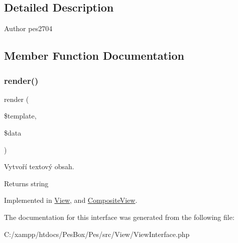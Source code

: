 \subsection{Detailed Description}
\begin{DoxyAuthor}{Author}
pes2704 
\end{DoxyAuthor}


\subsection{Member Function Documentation}
\mbox{\label{interface_pes_1_1_view_1_1_view_interface_ab273a8d7deb9bb9235161c4f8419e402}} 
\subsubsection{\texorpdfstring{render()}{render()}}
{\footnotesize\ttfamily render (\begin{DoxyParamCaption}\item[{\mbox{\hyperlink{interface_pes_1_1_view_1_1_template_1_1_template_interface}{Template\+Interface}}}]{\$template,  }\item[{}]{\$data }\end{DoxyParamCaption})}

Vytvoří textový obsah. \begin{DoxyReturn}{Returns}
string 
\end{DoxyReturn}


Implemented in \mbox{\hyperlink{class_pes_1_1_view_1_1_view_a62b5a3861ff3b1f8a28911db4c11ae47}{View}}, and \mbox{\hyperlink{class_pes_1_1_view_1_1_composite_view_a62b5a3861ff3b1f8a28911db4c11ae47}{Composite\+View}}.



The documentation for this interface was generated from the following file\+:\begin{DoxyCompactItemize}
\item 
C\+:/xampp/htdocs/\+Pes\+Box/\+Pes/src/\+View/View\+Interface.\+php\end{DoxyCompactItemize}
